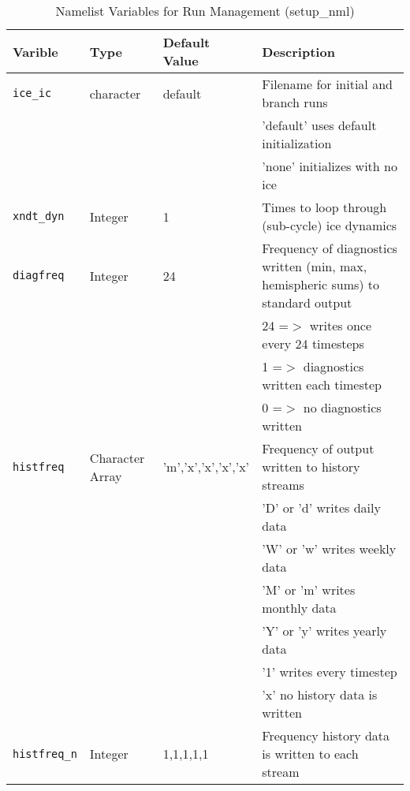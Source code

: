 \begin{table}[hb]
  \begin{center}
  \caption{Namelist Variables for Run Management (setup_nml)}
  \label{table:setup_nml}
   \begin{tabular}{p{2.0cm}p{2.0cm}p{4.0cm}p{6.5cm}} \hline
Varible  & Type & Default Value & Description               \\

\hline \hline

{\tt ice\_ic}&  character  & default & Filename for initial and branch runs \\
             &             &         & 'default' uses default initialization \\
             &             &         & 'none' initializes with no ice \\

{\tt xndt\_dyn}&  Integer  & 1 & Times to loop through (sub-cycle) ice dynamics \\

{\tt diagfreq} &  Integer &  24 & Frequency of diagnostics written
                     (min, max, hemispheric sums) to standard output   \\
         &          &     & 24  =$>$ writes once every 24 timesteps  \\
         &          &     & 1  =$>$ diagnostics written each timestep \\
         &          &     & 0  =$>$ no diagnostics written \\

{\tt histfreq} & Character Array & 'm','x','x','x','x' & 
                            Frequency of output written to history streams \\
         &          &     & 'D' or 'd' writes daily data \\
         &          &     & 'W' or 'w' writes weekly data \\
         &          &     & 'M' or 'm' writes monthly data \\
         &          &     & 'Y' or 'y' writes yearly data \\
         &          &     & '1' writes every timestep \\
         &          &     & 'x' no history data is written \\

{\tt histfreq\_n} & Integer & 1,1,1,1,1 & Frequency history data is written to each stream \\


\end{tabular}
\end{center}
\end{table}
